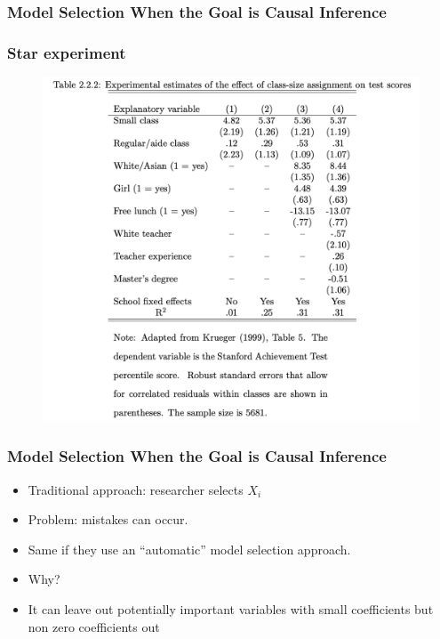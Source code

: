 \documentclass[
  shownotes,
  xcolor={svgnames},
  hyperref={colorlinks,citecolor=DarkBlue,linkcolor=DarkRed,urlcolor=DarkBlue}
  , aspectratio=169]{beamer}
\begin{document}
\begin{frame}[fragile]
\frametitle{Model Selection When the Goal is Causal Inference}
\frametitle{Star experiment}

\begin{figure}[H] \centering
  \centering
  \includegraphics[scale=0.3]{figures/star2.png}
\end{figure}

\end{frame}
\begin{frame}[fragile]
\frametitle{Model Selection When the Goal is Causal Inference}

\begin{itemize}
  \item Traditional approach: researcher selects $X_i$
  \medskip
  \pause 
  \item Problem: mistakes can occur.
  \medskip
  \item Same if they use an ``automatic'' model selection approach. 
  \medskip
  \item Why?
  \pause 
  \item It can leave out potentially important variables with small coefficients but non zero coefficients out
\end{itemize}  

  \end{frame}
\end{document}
